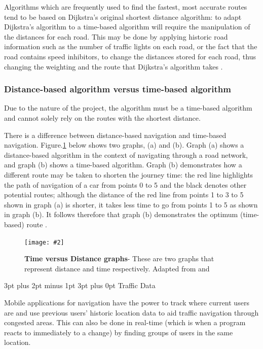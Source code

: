 \documentclass[12pt,a4paper]{article}
\makeatletter
\newcommand{\figuremacro}[5]{
    \begin{figure}[#1]
        \centering
        \texttt{[image: \#2]}
        \caption[#3]{\textbf{#3}#4}
        \label{fig:#2}
    \end{figure}
}
\renewcommand\subsection{\@startsection {subsection}{1}{0mm} %
                               {3pt plus 2pt minus 1pt} %
                               {3pt plus 0pt} %
                               {\normalfont\bfseries}}
\makeatother
\begin{document}
Algorithms which are frequently used to find the fastest, most accurate routes tend to be based on Dijkstra’s original shortest distance algorithm: to adapt Dijkstra's algorithm to a time-based algorithm will require the manipulation of the distances for each road. This may be done by applying historic road information such as the number of traffic lights on each road, or the fact that the road contains speed inhibitors, to change the distances stored for each road, thus changing the weighting and the route that Dijkstra's algorithm takes \cite{Zheng2018}. 

\newpage

\subsubsection{Distance-based algorithm versus time-based algorithm}

Due to the nature of the project, the algorithm must be a time-based algorithm and cannot solely rely on the routes with the shortest distance.

There is a difference between distance-based navigation and time-based navigation. Figure.\ref{fig:TimevsDistanceWeightFactors} below shows two graphs, (a) and (b). Graph (a) shows a distance-based algorithm in the context of navigating through a road network, and graph (b) shows a time-based algorithm. Graph (b) demonstrates how a different route may be taken to shorten the journey time: the red line highlights the path of navigation of a car from points 0 to 5 and the black denotes other potential routes; although the distance of the red line from points 1 to 3 to 5 shown in graph (a) is shorter, it takes less time to go from points 1 to 5 as shown in graph (b). It follows therefore that graph (b) demonstrates the optimum (time-based) route \cite{Zheng2018}. 

\figuremacro{h}{TimevsDistanceWeightFactors}{Time versus Distance graphs}{- These are two graphs that represent distance and time respectively. Adapted from \cite{Zheng2018} and \cite{SpeedvsTime}}{0.6} 

\subsection{Traffic Data}

Mobile applications for navigation have the power to track where current users are and use previous users’ historic location data to aid traffic navigation through congested areas. This can also be done in real-time (which is when a program reacts to immediately to a change) by finding groups of users in the same location.
\end{document}
